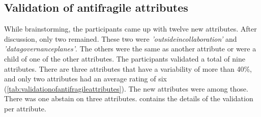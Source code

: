 \subsection{Validation of antifragile attributes}
\label{sub:validationofantifragileattributes}
While brainstorming, the participants came up with twelve new \glspl{attribute}. After discussion, only two remained. These two were \textit{'\gls{outsideincollaboration}'} and \textit{'\gls{datagovernanceplanes}'}. The others were the same as another \gls{attribute} or were a child of one of the other \glspl{attribute}. The participants validated a total of nine \glspl{attribute}. There are three \glspl{attribute} that have a variability of more than 40\%, and only two \glspl{attribute} had an average rating of six (\cref{tab:validationofantifragileattributes}). The new \glspl{attribute} were among those. There was one abstain on three \glspl{attribute}.  contains the details of the validation per \gls{attribute}.
\begin{table}[H]
	\centering
	\caption{Validation of antifragile attributes}
	\label{tab:validationofantifragileattributes}%
\end{table}%

